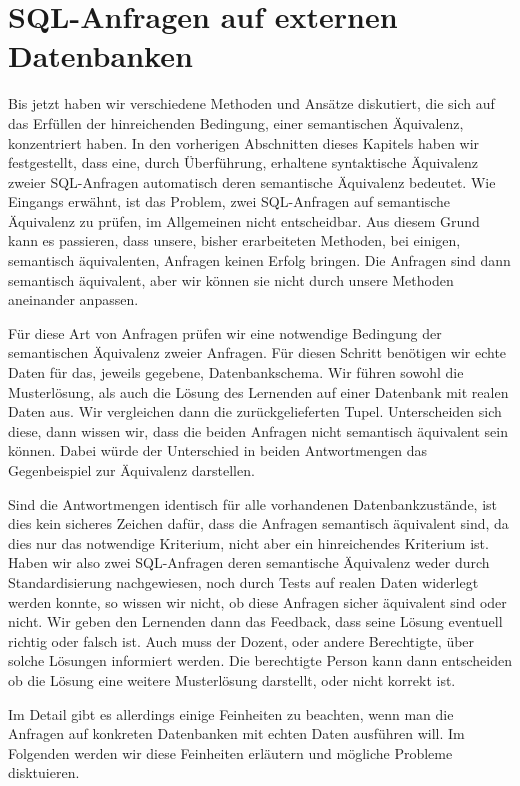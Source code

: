 \section{SQL-Anfragen auf externen Datenbanken}

Bis jetzt haben wir verschiedene Methoden und Ansätze diskutiert, die sich auf das Erfüllen der hinreichenden Bedingung, einer semantischen Äquivalenz, konzentriert haben. In den vorherigen Abschnitten dieses Kapitels haben wir festgestellt, dass eine, durch Überführung, erhaltene syntaktische Äquivalenz zweier SQL-Anfragen automatisch deren semantische Äquivalenz bedeutet. Wie Eingangs erwähnt, ist das Problem, zwei SQL-Anfragen auf semantische Äquivalenz zu prüfen, im Allgemeinen nicht entscheidbar. Aus diesem Grund kann es passieren, dass unsere, bisher erarbeiteten Methoden, bei einigen, semantisch äquivalenten, Anfragen keinen Erfolg bringen. Die Anfragen sind dann semantisch äquivalent, aber wir können sie nicht durch unsere Methoden aneinander anpassen. 

Für diese Art von Anfragen prüfen wir eine notwendige Bedingung der semantischen Äquivalenz zweier Anfragen. Für diesen Schritt benötigen wir echte Daten für das, jeweils gegebene, Datenbankschema. Wir führen sowohl die Musterlösung, als auch die Lösung des Lernenden auf einer Datenbank mit realen Daten aus. Wir vergleichen dann die zurückgelieferten Tupel. Unterscheiden sich diese, dann wissen wir, dass die beiden Anfragen nicht semantisch äquivalent sein können. Dabei würde der Unterschied in beiden Antwortmengen das Gegenbeispiel zur Äquivalenz darstellen.

Sind die Antwortmengen identisch für alle vorhandenen Datenbankzustände, ist dies kein sicheres Zeichen dafür, dass die Anfragen semantisch äquivalent sind, da dies nur das notwendige Kriterium, nicht aber ein hinreichendes Kriterium ist. Haben wir also zwei SQL-Anfragen deren semantische Äquivalenz weder durch Standardisierung nachgewiesen, noch durch Tests auf realen Daten widerlegt werden konnte, so wissen wir nicht, ob diese Anfragen sicher äquivalent sind oder nicht. Wir geben den Lernenden dann das Feedback, dass seine Lösung eventuell richtig oder falsch ist. Auch muss der Dozent, oder andere Berechtigte, über solche Lösungen informiert werden. Die berechtigte Person kann dann entscheiden ob die Lösung eine weitere Musterlösung darstellt, oder nicht korrekt ist.

Im Detail gibt es allerdings einige Feinheiten zu beachten, wenn man die Anfragen auf konkreten Datenbanken mit echten Daten ausführen will. Im Folgenden werden wir diese Feinheiten erläutern und mögliche Probleme disktuieren.

